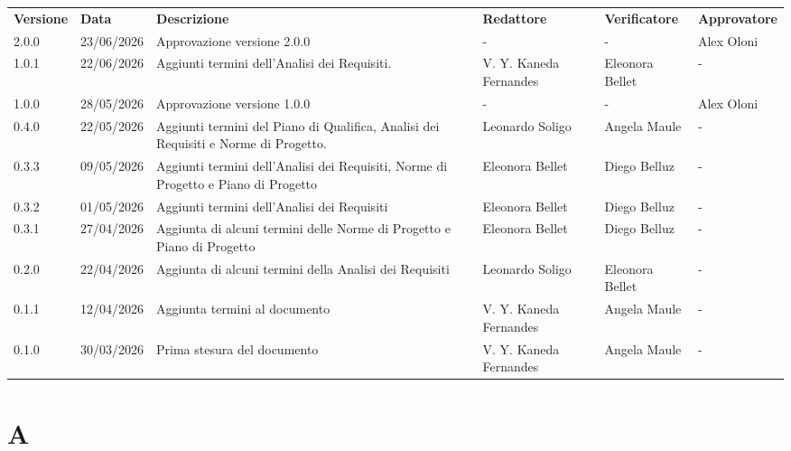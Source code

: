 \documentclass[a4paper,12pt]{article}
\begin{document}
\renewcommand{\arraystretch}{1.35}
\begin{center}
    {\footnotesize
    \begin{tabularx}{\textwidth}{|l|l|X|p{2cm}|p{2cm}|p{2cm}|}
        \hline
        \rowcolor{gray!20}
        \textbf{Versione} & \textbf{Data} & \textbf{Descrizione} & \textbf{Redattore} & \textbf{Verificatore} & \textbf{Approvatore} \\
        2.0.0 & 23/06/2026 & Approvazione versione 2.0.0 & - & - & Alex Oloni \\
        1.0.1 & 22/06/2026 & Aggiunti termini dell'Analisi dei Requisiti. & V. Y. Kaneda Fernandes & Eleonora Bellet & - \\
        1.0.0 & 28/05/2026 & Approvazione versione 1.0.0 & - & - & Alex Oloni \\
        0.4.0 & 22/05/2026 & Aggiunti termini del Piano di Qualifica, Analisi dei Requisiti e Norme di Progetto. & Leonardo Soligo & Angela Maule & - \\
        0.3.3 & 09/05/2026 & Aggiunti termini dell'Analisi dei Requisiti, Norme di Progetto e Piano di Progetto & Eleonora Bellet & Diego Belluz & - \\
        0.3.2 & 01/05/2026 & Aggiunti termini dell'Analisi dei Requisiti & Eleonora Bellet & Diego Belluz & - \\
        0.3.1 & 27/04/2026 & Aggiunta di alcuni termini delle Norme di Progetto e Piano di Progetto & Eleonora Bellet & Diego Belluz & - \\
        0.2.0 & 22/04/2026 & Aggiunta di alcuni termini della Analisi dei Requisiti& Leonardo Soligo & Eleonora Bellet & - \\
        0.1.1 & 12/04/2026 & Aggiunta termini al documento & V. Y. Kaneda Fernandes & Angela Maule & - \\
        0.1.0 & 30/03/2026 & Prima stesura del documento & V. Y. Kaneda Fernandes & Angela Maule & - \\
        \hline 
    \end{tabularx}
    }
\end{center}

\newpage
{}
\setcounter{page}{1}
\newpage

\tableofcontents

\newpage


\section{A}
\end{document}
